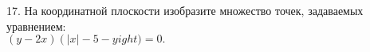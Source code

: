17. На координатной плоскости изобразите множество точек, задаваемых уравнением:\\ $(y-2x)\left(|x|-5-y
ight)=0.$\\
